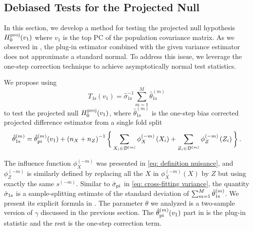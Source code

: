 \documentclass[11pt]{article}
\begin{document}
\subsection{Debiased Tests for the Projected Null}\label{section: debiased test}
In this section, we develop a method for testing the projected null hypothesis $H_0^{\rm proj}(v_1)$ where $v_1$ is the top PC of the population covariance matrix. As we observed in , the plug-in estimator combined with the given variance estimator does not approximate a standard normal. To address this issue, we leverage the one-step correction technique to achieve asymptotically normal test statistics. 

We propose using 
\begin{equation*}
T_{\mathrm{1s}}\left(v_1\right)=\hat{\sigma}_{\mathrm{1s}}^{-1} \sum_{m=1}^M \hat{\theta}_{\mathrm{1s}}^{(m)}
\end{equation*}
to test the projected null $H_0^{\rm proj}(v_1)$, where $\hat{\theta}_{\mathrm{1s}}^{(m)}$ is the one-step bias corrected projected difference estimator from a single fold split 
\begin{equation}\label{eq:debiased test statistics}
    \hat{\theta}_{\mathrm{1s}}^{(m)} = \hat{\theta}_{\rm pi}^{(m)}(v_1)+\left(n_X+n_Z\right)^{-1}\bigg\{\sum_{X_i \in \mathcal{D}^{(m)}} \phi_X^{(-m)}\left(X_i\right)+\sum_{Z_i \in \mathcal{D}^{(m)}} \phi_Z^{(-m)}\left(Z_i\right)\bigg\}\,.
\end{equation}

The influence function $\phi_X^{(-m)}$ was presented in \eqref{eq: definition nuisance}, and $\phi_Z^{(-m)}$ is similarly defined by replacing all the $X$ in $\phi_X^{(-m)}(X)$ by $Z$ but using exactly the same $s^{(-m)}$. Similar to $\hat \sigma_{\rm pi}$ in \eqref{eq: cross-fitting variance}, the quantity $\hat \sigma_{\rm 1s}$ is a sample-splitting estimate of the standard deviation of $\sum_{m=1}^M \hat{\theta}_{\rm 1s}^{(m)}$. We present its explicit formula in . The parameter $\theta$ we analyzed is a two-sample version of $\gamma$ discussed in the previous section. The $\hat{\theta}_{\rm pi}^{(m)}(v_1)$ part in  is the plug-in statistic and the rest is the one-step correction term. 
\end{document}
